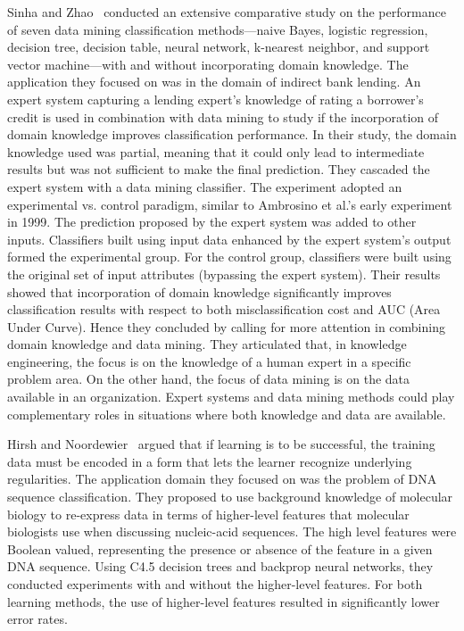 Sinha and Zhao~\cite{Sinha08} conducted an extensive comparative study on the performance of seven data mining classification methods---naive Bayes, logistic regression, decision tree, decision table, neural network, k-nearest neighbor, and support vector machine---with and without incorporating domain knowledge. The application they focused on was in the domain of indirect bank lending. An expert system capturing a lending expert's knowledge of rating a borrower's credit is used in combination with data mining to study if the incorporation of domain knowledge improves classification performance. In their study, the domain knowledge used was partial, meaning that it could only lead to intermediate results but was not sufficient to make the final prediction. They cascaded the expert system with a data mining classifier. The experiment adopted an experimental vs. control paradigm, similar to Ambrosino et al.'s early experiment in 1999. The prediction proposed by the expert system was added to other inputs. Classifiers built using input data enhanced by the expert system's output formed the experimental group. For the control group, classifiers were built using the original set of input attributes (bypassing the expert system). Their results showed that incorporation of domain knowledge significantly improves classification results with respect to both misclassification cost and AUC (Area Under Curve). Hence they concluded by calling for more attention in combining domain knowledge and data mining. They articulated that, in knowledge engineering, the focus is on the knowledge of a human expert in a specific problem area. On the other hand, the focus of data mining is on the data available in an organization. Expert systems and data mining methods could play complementary roles in situations where both knowledge and data are available.

Hirsh and Noordewier~\cite{Hirsh94} argued that if learning is to be successful, the training data must be encoded in a form that lets the learner recognize underlying regularities. The application domain they focused on was the problem of DNA sequence classification. They proposed to use background knowledge of molecular biology to re-express data in terms of higher-level features that molecular biologists use when discussing nucleic-acid sequences. The high level features were Boolean valued, representing the presence or absence of the feature in a given DNA sequence. Using C4.5 decision trees and backprop neural networks, they conducted experiments with and without the higher-level features. For both learning methods, the use of higher-level features resulted in significantly lower error rates.

